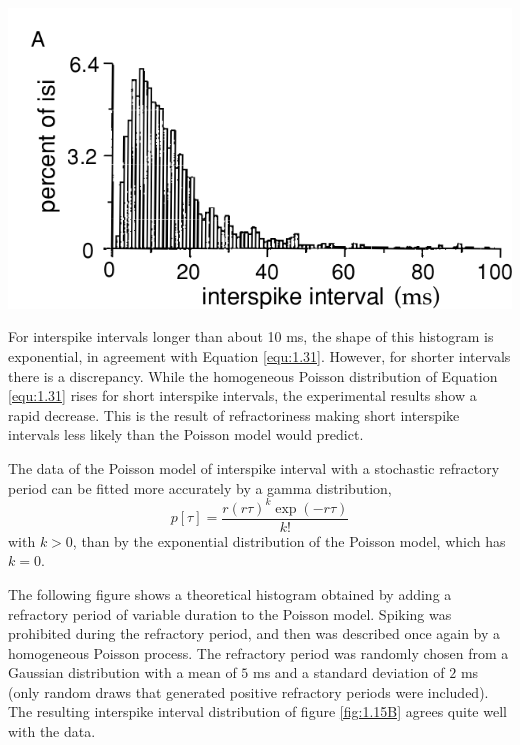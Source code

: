 \begin{center}
    \label{fig:1.15A}    
    \includegraphics[trim=30 0 0 60,clip,scale = 0.36]{png/Figure1-15-A.png}\\        
\end{center}
For interspike intervals longer than about 10 ms, the shape of this histogram is exponential, in agreement with Equation \ref{equ:1.31}. However, for shorter intervals there is a discrepancy. While the homogeneous Poisson distribution of Equation \ref{equ:1.31} rises for short interspike intervals, the experimental results show a rapid decrease. This is the result of refractoriness making short interspike intervals less likely than the Poisson model would predict.
\begin{rem}
\end{rem}
\begin{prop}
    The data of the Poisson model of interspike interval with a stochastic refractory period can be fitted more accurately by a gamma distribution, 
    \begin{equation}
        p[\tau] = \frac{r(r\tau)^k\exp(-r\tau)}{k!}
        \label{equ:1.39}
    \end{equation}
    with $k>0$, than by the exponential distribution of the Poisson model, which has $k = 0$.
\end{prop}

\begin{exm}
    The following figure shows a theoretical histogram obtained by adding a refractory period of variable duration to the Poisson model. Spiking was prohibited during the refractory period,  and then was described once again by a homogeneous Poisson process. The refractory period was randomly chosen from a Gaussian distribution with a mean of $5$ ms and a standard
deviation of $2$ ms (only random draws that generated positive refractory periods were included). The resulting interspike interval distribution of figure \ref{fig:1.15B} agrees quite well with the data.
\end{exm}

